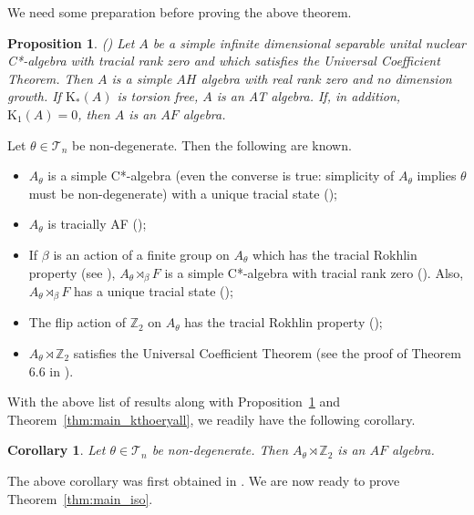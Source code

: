\documentclass[9pt, BCOR=2mm]{amsart}
\numberwithin{equation}{section}
\numberwithin{equation}{section}
\newtheorem{proposition}[theorem]{Proposition}
\newtheorem{corollary}[theorem]{Corollary}
\newcommand{\Z}{{\mathbb{Z}}}
\newcommand{\K}{\mathrm{K}} %
\begin{document}
 We need some preparation before proving the above theorem. 

 	  \begin{proposition}\label{prop:phi06}(\cite[Proposition 3.7]{Phi06})
	 Let $A$ be a simple infinite dimensional separable unital nuclear C*-algebra with tracial rank zero and which satisfies the Universal Coefficient Theorem. Then $A$ is a simple $A H$ algebra with real rank zero and no dimension growth. If $\K_{*}(A)$ is torsion free, $A$ is an AT algebra. If, in addition, $\K_{1}(A)=0$, then $A$ is an $A F$ algebra.
\end{proposition}

Let $\theta \in \mathcal{T}_{n}$ be non-degenerate. Then the following are known.

\begin{itemize}
	\item $A_{\theta}$ is a simple C*-algebra (even the converse is true: simplicity of $A_\theta$ implies $\theta$ must be non-degenerate) with a unique tracial state (\cite[Theorem 1.9]{Phi06});
	\item $A_{\theta}$ is tracially AF (\cite[Theorem 3.6]{Phi06});
	\item If $\beta$ is an action of a finite group on $A_{\theta}$  which has the tracial Rokhlin property (see \cite[Section 5]{ELPW10}), $A_{\theta} \rtimes_{\beta} F$ is a simple C*-algebra with tracial rank zero (\cite[Corollary 1.6, Theorem 2.6]{Phi11}). Also, $A_{\theta} \rtimes_{\beta} F$ has a unique tracial state (\cite[Proposition 5.7]{ELPW10});
	\item The flip action of $\Z_2$ on $A_\theta$ has the tracial Rokhlin property (\cite[Lemma 5.10 and Theorem 5.5]{ELPW10});
	\item $A_{\theta} \rtimes \Z_2$ satisfies the Universal Coefficient Theorem (see the proof of Theorem 6.6 in \cite{ELPW10}).
	\end{itemize}

With the above list of results along with Proposition~\ref{prop:phi06} and Theorem~\ref{thm:main_kthoeryall}, we readily have the following corollary. 

\begin{corollary}\label{cor:flip_AF}
	Let $\theta \in \mathcal{T}_{n}$ be non-degenerate. Then  $A_\theta\rtimes \Z_2$ is an $A F$ algebra.
\end{corollary}
\noindent The above corollary was first obtained in \cite[Theorem 6.6]{ELPW10}. We are now ready to prove Theorem~\ref{thm:main_iso}. 
\end{document}

